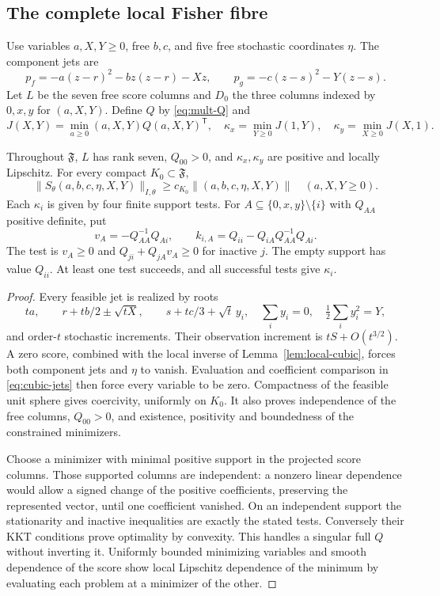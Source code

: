 \subsection{The complete local Fisher fibre}
Use variables $a,X,Y\ge0$, free $b,c$, and five free stochastic
coordinates $\eta$. The component jets are
\begin{equation}\label{eq:cubic-jets}
 p_f=-a(z-r)^2-bz(z-r)-Xz,\qquad
 p_g=-c(z-s)^2-Y(z-s).
\end{equation}
Let $L$ be the seven free score columns and $D_0$ the three columns
indexed by $0,x,y$ for $(a,X,Y)$. Define $Q$ by \eqref{eq:mult-Q} and
\begin{equation}\label{eq:cubic-kappa}
 J(X,Y)=\min_{a\ge0}(a,X,Y)Q(a,X,Y)^{\mathsf T},\quad
 \kappa_x=\min_{Y\ge0}J(1,Y),\quad
 \kappa_y=\min_{X\ge0}J(X,1).
\end{equation}

\begin{proposition}\label{prop:cubic-Q}
Throughout $\mathfrak F$, $L$ has rank seven, $Q_{00}>0$, and
$\kappa_x,\kappa_y$ are positive and locally Lipschitz. For every compact
$K_0\subset\mathfrak F$,
\[
 \|S_\theta(a,b,c,\eta,X,Y)\|_{I,\theta}
       \ge c_{K_0}\|(a,b,c,\eta,X,Y)\|\quad(a,X,Y\ge0).
\]
Each $\kappa_i$ is given by four finite support tests. For
$A\subseteq\{0,x,y\}\setminus\{i\}$ with $Q_{AA}$ positive definite, put
\[
 v_A=-Q_{AA}^{-1}Q_{Ai},\qquad k_{i,A}=Q_{ii}-Q_{iA}Q_{AA}^{-1}Q_{Ai}.
\]
The test is $v_A\ge0$ and $Q_{ji}+Q_{jA}v_A\ge0$ for inactive $j$.
The empty support has value $Q_{ii}$. At least one test succeeds, and
all successful tests give $\kappa_i$.
\end{proposition}
\begin{proof}
Every feasible jet is realized by roots
\[
 ta,\qquad r+tb/2\pm\sqrt{tX},\qquad
 s+tc/3+\sqrt t\,y_i,\quad \sum_i y_i=0,\quad\tfrac12\sum_i y_i^2=Y,
\]
and order-$t$ stochastic increments. Their observation increment is
$tS+O(t^{3/2})$. A zero score, combined with the local inverse of
Lemma~\ref{lem:local-cubic}, forces both component jets and $\eta$ to
vanish. Evaluation and coefficient comparison in \eqref{eq:cubic-jets}
then force every variable to be zero. Compactness of the feasible unit
sphere gives coercivity, uniformly on $K_0$. It also proves independence
of the free columns, $Q_{00}>0$, and existence, positivity and boundedness
of the constrained minimizers.

Choose a minimizer with minimal positive support in the projected
score columns. Those supported columns are independent: a nonzero
linear dependence would allow a signed change of the positive
coefficients, preserving the represented vector, until one coefficient
vanished. On an independent support the stationarity and inactive
inequalities are exactly the stated tests. Conversely their KKT
conditions prove optimality by convexity. This handles a singular full
$Q$ without inverting it. Uniformly bounded minimizing variables and
smooth dependence of the score show local Lipschitz dependence of the
minimum by evaluating each problem at a minimizer of the other.
\end{proof}

